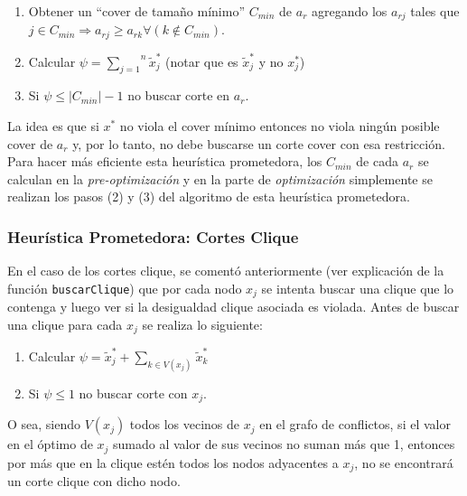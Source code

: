 \begin{enumerate}
\item Obtener un ``cover de tamaño mínimo'' $C_{min}$ de $a_r$ agregando los $a_{rj}$ tales que $j\in C_{min} \Rightarrow a_{rj} \geq a_{rk} \forall (k \notin C_{min})$.
\item Calcular $\psi = \overset{n}{\underset{j=1}{\sum}} \tilde{x}^*_j$ (notar que es $\tilde{x}^*_j$ y no $x^*_j$)
\item Si $\psi \leq |C_{min}| - 1$ no buscar corte en $a_r$.
\end{enumerate}

La idea es que si $x^*$ no viola el cover mínimo entonces no viola ningún posible cover de $a_r$ y, por lo tanto, no debe buscarse un corte cover con esa restricción. Para hacer más eficiente esta heurística prometedora, los $C_{min}$ de cada $a_r$ se calculan en la \emph{pre-optimización} y en la parte de \emph{optimización} simplemente se realizan los pasos (2) y (3) del algoritmo de esta heurística prometedora.

\subsubsection*{Heurística Prometedora: Cortes Clique}

En el caso de los cortes clique, se comentó anteriormente (ver explicación de la función \verb_buscarClique_) que por cada nodo $x_j$ se intenta buscar una clique que lo contenga y luego ver si la desigualdad clique asociada es violada. Antes de buscar una clique para cada $x_j$ se realiza lo siguiente:

\begin{enumerate}
\item Calcular $\psi = \tilde{x}^*_j + \overset{}{\underset{k\in V(x_j)}{\sum}} \tilde{x}^*_k$
\item Si $\psi \leq 1$ no buscar corte con $x_j$.
\end{enumerate}

O sea, siendo $V(x_j)$ todos los vecinos de $x_j$ en el grafo de conflictos, si el valor en el óptimo de $x_j$ sumado al valor de sus vecinos no suman más que 1, entonces por más que en la clique estén todos los nodos adyacentes a $x_j$, no se encontrará un corte clique con dicho nodo.
